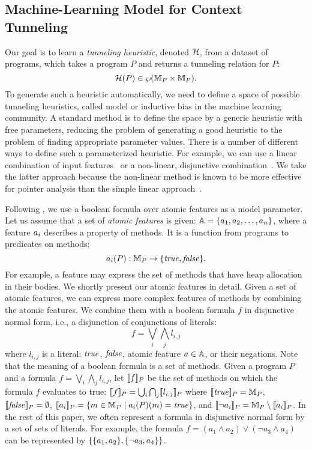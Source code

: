 \subsection{Machine-Learning Model for Context Tunneling}



Our goal is to learn a {\em tunneling heuristic}, denoted
$\mathcal{H}$, from a dataset of programs, which takes a program $P$
and returns a tunneling relation for $P$:
\[
  \mathcal{H}(P) \in \wp({\mathbb{M}}_P \times {\mathbb{M}}_P).
\]
To generate such a heuristic automatically, we need to define a space
of possible tunneling heuristics, called model or inductive bias in
the machine learning community.  A standard
method is to define the space by a generic heuristic with free
parameters, reducing the problem of generating a good heuristic to the
problem of finding appropriate parameter values.  There is a number of
different ways to define such a parameterized heuristic. For example,
we can use a linear combination of input features~\cite{Oh2015} or a
non-linear, disjunctive combination~\cite{JeJeChOh17}. We take the latter approach because the
non-linear method is known to be more effective for pointer analysis
than the simple linear approach~\cite{JeJeChOh17}.

Following \cite{JeJeChOh17},
we use a boolean formula over atomic features as a model parameter.
Let us assume that a set of {\em atomic features} is given:
$\mathbb{A} = \{ a_1, a_2, \dots, a_n \}$, where a feature $a_i$ describes a property of
methods. It is a function from programs to predicates on
methods:
\[
a_i(P) : {\mathbb{M}}_P \to \{ {\it true},{\it false} \}.
\]
For example, a feature may express the set of methods that have
heap allocation in their bodies. We shortly present our atomic features in
detail.
Given a set of atomic features, we can express more complex features
of methods by combining the atomic features.
We combine them with
a boolean formula $f$ in disjunctive normal form, i.e., a disjunction of conjunctions
of literals:
\[
f = \bigvee_i \bigwedge_j l_{i,j}
\]
where $l_{i,j}$ is a literal: ${\it true}$, ${\it false}$, atomic feature $a \in \mathbb{A}$,
or their negations.
Note that the meaning of a boolean formula is a set of methods.
Given a program $P$ and a formula $f =\bigvee_i \bigwedge_j l_{i,j}$, let $[\![f]\!]_P$ be the set of methods
on which the formula $f$ evaluates to true: $[\![f]\!]_P = \bigcup_i
\bigcap_j [\![l_{i,j}]\!]_P$ where $[\![{\it true}]\!]_P = {\mathbb{M}}_P$,
$[\![{\it false}]\!]_P = \emptyset$, $[\![a_i]\!]_P = \{ m \in
 {\mathbb{M}}_P \mid a_i(P)(m) = {\it true} \}$, and $[\![\neg a_i]\!]_P =
 {\mathbb{M}}_P \setminus [\![a_i]\!]_P$.
In the rest of this paper, we often represent a formula in
disjunctive normal form by a set of sets of literals. For example, the formula
$f = (a_1 \land a_2) \vee (\neg a_3 \land a_4)$ can be
represented by $\{ \{ a_1,a_2 \}, \{ \neg a_3,a_4 \} \}$.



